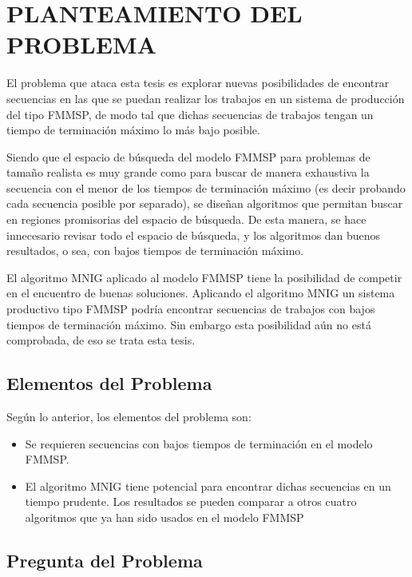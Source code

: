 \documentclass{article}
\begin{document}
\section{PLANTEAMIENTO DEL PROBLEMA}

El problema que ataca esta tesis es explorar nuevas posibilidades de encontrar
secuencias en las que se puedan realizar los trabajos en un sistema de
producción del tipo FMMSP, de modo tal que dichas secuencias de trabajos
tengan un tiempo de terminación máximo lo más bajo posible.

\vspace{\baselineskip}
Siendo que el espacio de búsqueda del modelo FMMSP para problemas de tamaño
realista es muy grande como para buscar de manera exhaustiva la secuencia con
el menor de los tiempos de terminación máximo (es decir probando cada secuencia
posible por separado), se diseñan algoritmos que permitan buscar en regiones
promisorias del espacio de búsqueda. De esta manera, se hace innecesario 
revisar todo el espacio de búsqueda, y los algoritmos dan buenos resultados,
o sea, con bajos tiempos de terminación máximo.

\vspace{\baselineskip}
El algoritmo MNIG aplicado al modelo FMMSP tiene la posibilidad de competir
en el encuentro de buenas soluciones. Aplicando el algoritmo MNIG un sistema
productivo tipo FMMSP podría encontrar secuencias de trabajos con bajos tiempos
de terminación máximo. Sin embargo esta posibilidad aún no está comprobada, de
eso se trata esta tesis.

\subsection{Elementos del Problema}

Según lo anterior, los elementos del problema son:

\vspace{\baselineskip}
\begin{itemize}
    \item[\maltese] Se requieren secuencias con bajos tiempos de terminación en
    el modelo FMMSP.
    \item[\maltese] El algoritmo MNIG tiene potencial para encontrar dichas
    secuencias en un tiempo prudente. Los resultados se pueden comparar a otros
    cuatro algoritmos que ya han sido usados en el modelo FMMSP
\end{itemize}

\subsection{Pregunta del Problema}
\end{document}
